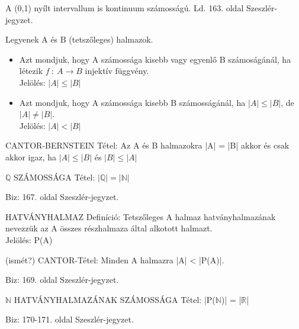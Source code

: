 \documentclass[]{article}
\begin{document}
A (0,1) nyílt intervallum is kontinuum számosságú. Ld. 163. oldal Szeszlér-jegyzet.
\begin{shaded}
Legyenek A és B (tetszőleges) halmazok.
\begin{itemize}
\item Azt mondjuk, hogy A számossága kisebb vagy egyenlő B számoságánál, ha létezik $f\::\:A \to B$ injektív függvény.\\
Jelölés: $|A| \leq |B|$
\item Azt mondjuk, hogy A számossága kisebb B számosságánál, ha $|A| \leq |B|$, de $|A| \neq |B|$.\\
Jelölés: $|A| < |B|$
\end{itemize}
\end{shaded}
\begin{framed}
CANTOR-BERNSTEIN Tétel: Az A és B halmazokra |A| = |B| akkor és csak akkor igaz, ha $|A| \leq |B|$ és $|B| \leq |A|$
\end{framed}
\begin{framed}
$\mathbb{Q}$ SZÁMOSSÁGA Tétel: $|\mathbb{Q}| = |\mathbb{N}|$
\end{framed}
\begin{leftbar}
Biz: 167. oldal Szeszlér-jegyzet.
\end{leftbar}
\begin{shaded}
HATVÁNYHALMAZ Definíció: Tetszőleges A halmaz hatványhalmazának nevezzük az A összes részhalmaza által alkotott halmazt.\\
Jelölés: P(A)
\end{shaded}
\begin{framed}
(ismét?) CANTOR-Tétel: Minden A halmazra |A| < |P(A)|.
\end{framed}
\begin{leftbar}
Biz: 169. oldal Szeszlér-jegyzet.
\end{leftbar}
\begin{framed}
$\mathbb{N}$ HATVÁNYHALMAZÁNAK SZÁMOSSÁGA Tétel: |P($\mathbb{N}$)| = |$\mathbb{R}$|
\end{framed}
\begin{leftbar}
Biz: 170-171. oldal Szeszlér-jegyzet.
\end{leftbar}
\end{document}

